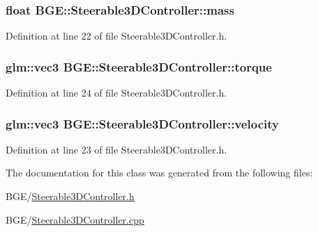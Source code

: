 \hypertarget{class_b_g_e_1_1_steerable3_d_controller_aa61c5d262cf69888bec16bf09c211bd8}{
\subsubsection[{mass}]{\setlength{\rightskip}{0pt plus 5cm}float B\-G\-E\-::\-Steerable3\-D\-Controller\-::mass}}\label{class_b_g_e_1_1_steerable3_d_controller_aa61c5d262cf69888bec16bf09c211bd8}


Definition at line 22 of file Steerable3\-D\-Controller.\-h.

\hypertarget{class_b_g_e_1_1_steerable3_d_controller_a5492963384aaba531357a411dab047e6}{
\subsubsection[{torque}]{\setlength{\rightskip}{0pt plus 5cm}glm\-::vec3 B\-G\-E\-::\-Steerable3\-D\-Controller\-::torque}}\label{class_b_g_e_1_1_steerable3_d_controller_a5492963384aaba531357a411dab047e6}


Definition at line 24 of file Steerable3\-D\-Controller.\-h.

\hypertarget{class_b_g_e_1_1_steerable3_d_controller_a20c68fc0563636782e2682be3e4926d0}{
\subsubsection[{velocity}]{\setlength{\rightskip}{0pt plus 5cm}glm\-::vec3 B\-G\-E\-::\-Steerable3\-D\-Controller\-::velocity}}\label{class_b_g_e_1_1_steerable3_d_controller_a20c68fc0563636782e2682be3e4926d0}


Definition at line 23 of file Steerable3\-D\-Controller.\-h.



The documentation for this class was generated from the following files\-:\begin{DoxyCompactItemize}
\item 
B\-G\-E/\hyperlink{_steerable3_d_controller_8h}{Steerable3\-D\-Controller.\-h}\item 
B\-G\-E/\hyperlink{_steerable3_d_controller_8cpp}{Steerable3\-D\-Controller.\-cpp}\end{DoxyCompactItemize}
